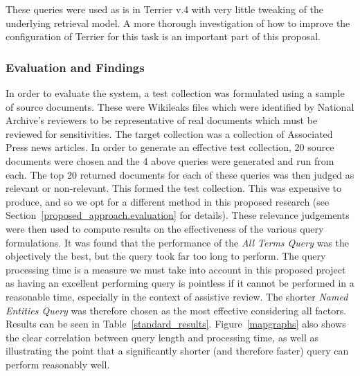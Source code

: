 \documentclass{mprop}
\begin{document}
These queries were used as is in Terrier v.4 with very little tweaking of the underlying retrieval model. A more thorough investigation of how to improve the configuration of Terrier for this task is an important part of this proposal.

\subsubsection{Evaluation and Findings}
In order to evaluate the system, a test collection was formulated using a sample of source documents. 
These were Wikileaks files which were identified by National Archive's reviewers to be representative of real documents which must be reviewed for sensitivities.
The target collection was a collection of Associated Press news articles.
In order to generate an effective test collection, 20 source documents were chosen and the 4 above queries were generated and run from each. 
The top 20 returned documents for each of these queries was then judged as relevant or non-relevant. 
This formed the test collection.
This was expensive to produce, and so we opt for a different method in this proposed research (see Section~\ref{proposed_approach.evaluation} for details).
These relevance judgements were then used to compute results on the effectiveness of the various query formulations.
It was found that the performance of the \textit{All Terms Query} was the objectively the best, but the query took far too long to perform. 
The query processing time is a measure we must take into account in this proposed project as having an excellent performing query is pointless if it cannot be performed in a reasonable time, especially in the context of assistive review. The shorter \textit{Named Entities Query } was therefore chosen as the most effective considering all factors. Results can be seen in Table~\ref{standard_results}. Figure~\ref{mapgraphs} also shows the clear correlation between query length and processing time, as well as illustrating the point that a significantly shorter (and therefore faster) query can perform reasonably well.
\end{document}
